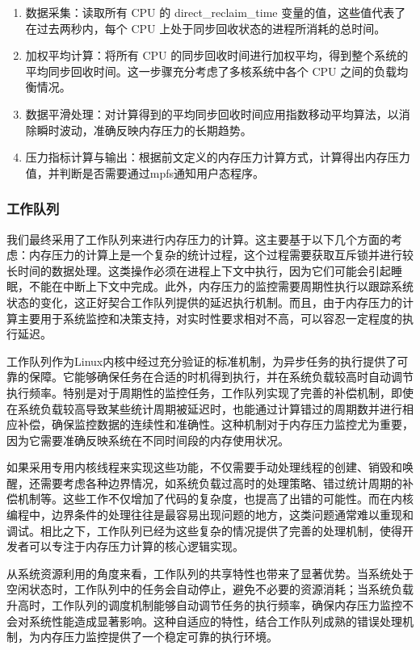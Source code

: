 \begin{enumerate}
    \item 数据采集：读取所有 CPU 的 direct\_reclaim\_time 变量的值，这些值代表了在过去两秒内，每个 CPU 上处于同步回收状态的进程所消耗的总时间。
    \item 加权平均计算：将所有 CPU 的同步回收时间进行加权平均，得到整个系统的平均同步回收时间。这一步骤充分考虑了多核系统中各个 CPU 之间的负载均衡情况。
    \item 数据平滑处理：对计算得到的平均同步回收时间应用指数移动平均算法，以消除瞬时波动，准确反映内存压力的长期趋势。
    \item 压力指标计算与输出：根据前文定义的内存压力计算方式，计算得出内存压力值，并判断是否需要通过mpfs通知用户态程序。
\end{enumerate}


\subsubsection{工作队列}
我们最终采用了工作队列来进行内存压力的计算。这主要基于以下几个方面的考虑：内存压力的计算上是一个复杂的统计过程，这个过程需要获取互斥锁并进行较长时间的数据处理。这类操作必须在进程上下文中执行，因为它们可能会引起睡眠，不能在中断上下文中完成。此外，内存压力的监控需要周期性执行以跟踪系统状态的变化，这正好契合工作队列提供的延迟执行机制。而且，由于内存压力的计算主要用于系统监控和决策支持，对实时性要求相对不高，可以容忍一定程度的执行延迟。

工作队列作为Linux内核中经过充分验证的标准机制，为异步任务的执行提供了可靠的保障。它能够确保任务在合适的时机得到执行，并在系统负载较高时自动调节执行频率。特别是对于周期性的监控任务，工作队列实现了完善的补偿机制，即使在系统负载较高导致某些统计周期被延迟时，也能通过计算错过的周期数并进行相应补偿，确保监控数据的连续性和准确性。这种机制对于内存压力监控尤为重要，因为它需要准确反映系统在不同时间段的内存使用状况。

如果采用专用内核线程来实现这些功能，不仅需要手动处理线程的创建、销毁和唤醒，还需要考虑各种边界情况，如系统负载过高时的处理策略、错过统计周期的补偿机制等。这些工作不仅增加了代码的复杂度，也提高了出错的可能性。而在内核编程中，边界条件的处理往往是最容易出现问题的地方，这类问题通常难以重现和调试。相比之下，工作队列已经为这些复杂的情况提供了完善的处理机制，使得开发者可以专注于内存压力计算的核心逻辑实现。

从系统资源利用的角度来看，工作队列的共享特性也带来了显著优势。当系统处于空闲状态时，工作队列中的任务会自动停止，避免不必要的资源消耗；当系统负载升高时，工作队列的调度机制能够自动调节任务的执行频率，确保内存压力监控不会对系统性能造成显著影响。这种自适应的特性，结合工作队列成熟的错误处理机制，为内存压力监控提供了一个稳定可靠的执行环境。


